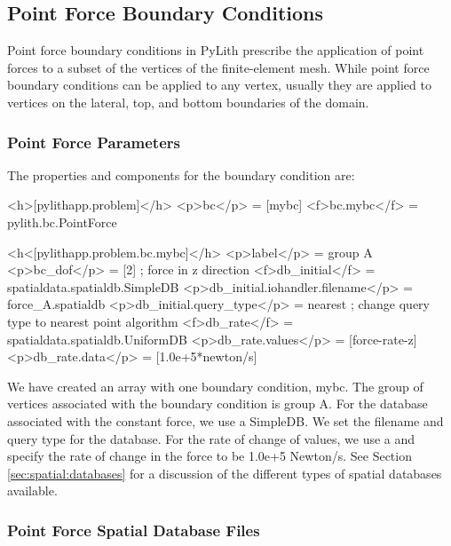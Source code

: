 \subsection{Point Force Boundary Conditions}

Point force boundary conditions in PyLith prescribe the application
of point forces to a subset of the vertices of the finite-element
mesh. While point force boundary conditions can be applied to any
vertex, usually they are applied to vertices on the lateral, top,
and bottom boundaries of the domain.

\subsubsection{Point Force Parameters}

The properties and components for the  boundary
condition are:
\begin{inventory}
\end{inventory}

\begin{cfg}
<h>[pylithapp.problem]</h>
<p>bc</p> = [mybc]
<f>bc.mybc</f> = pylith.bc.PointForce

<h<[pylithapp.problem.bc.mybc]</h>
<p>label</p> = group A 
<p>bc_dof</p> = [2] ; force in z direction
<f>db_initial</f> = spatialdata.spatialdb.SimpleDB
<p>db_initial.iohandler.filename</p> = force\_A.spatialdb
<p>db_initial.query_type</p> = nearest ; change query type to nearest point algorithm
<f>db_rate</f> = spatialdata.spatialdb.UniformDB
<p>db_rate.values</p> = [force-rate-z]
<p>db_rate.data</p> = [1.0e+5*newton/s]
\end{cfg}
We have created an array with one boundary condition, mybc. The group
of vertices associated with the boundary condition is group A. For
the database associated with the constant force, we use a SimpleDB.
We set the filename and query type for the database. For the rate
of change of values, we use a  and specify the rate of change
in the force to be 1.0e+5 Newton/s. See Section \vref{sec:spatial:databases}
for a discussion of the different types of spatial databases available.

\subsubsection{Point Force Spatial Database Files}

